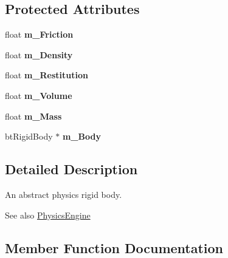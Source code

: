 \subsection*{Protected Attributes}
\begin{DoxyCompactItemize}
\item 
\mbox{\label{classTarbora_1_1RigidBody_a9663e9ae26e8ca6b53f0e9f35e1613dc}} 
float {\bfseries m\+\_\+\+Friction}
\item 
\mbox{\label{classTarbora_1_1RigidBody_a52a91e03c8a6d0f99f2a1ce1c85971b4}} 
float {\bfseries m\+\_\+\+Density}
\item 
\mbox{\label{classTarbora_1_1RigidBody_ac0b051f209ddc0aae2b79239d8a900f5}} 
float {\bfseries m\+\_\+\+Restitution}
\item 
\mbox{\label{classTarbora_1_1RigidBody_ae9624225a57bb682fb6e86d12677f502}} 
float {\bfseries m\+\_\+\+Volume}
\item 
\mbox{\label{classTarbora_1_1RigidBody_ad112c7c613a0557b132b10b29d62a110}} 
float {\bfseries m\+\_\+\+Mass}
\item 
\mbox{\label{classTarbora_1_1RigidBody_abe5878296d0cfc6796ff6383db14d062}} 
bt\+Rigid\+Body $\ast$ {\bfseries m\+\_\+\+Body}
\end{DoxyCompactItemize}


\subsection{Detailed Description}
An abstract physics rigid body. 

\begin{DoxySeeAlso}{See also}
\hyperlink{classTarbora_1_1PhysicsEngine}{Physics\+Engine} 
\end{DoxySeeAlso}


\subsection{Member Function Documentation}
\mbox{\label{classTarbora_1_1RigidBody_ae60a0e3d1f035698dfc11a117c28999b}} 
